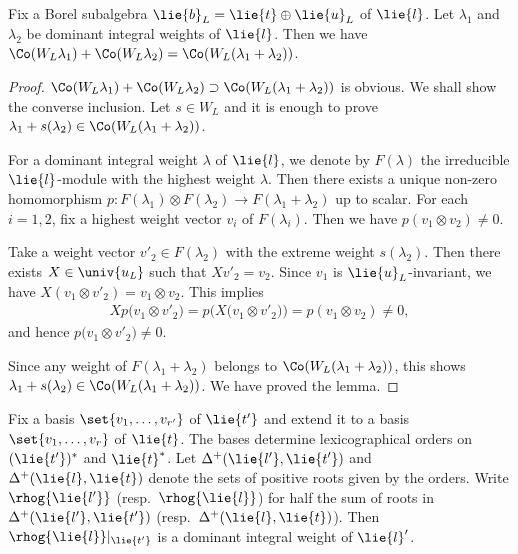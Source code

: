 \begin{Lemma}\label{lem:SumConvex}
	Fix a Borel subalgebra $\lie{b}_L = \lie{t}\oplus \lie{u}_L$ of $\lie{l}$.
	Let $\lambda_1$ and $\lambda_2$ be dominant integral weights of $\lie{l}$.
	Then we have $\Co(W_{L}\lambda_1)+\Co(W_{L}\lambda_2) = \Co(W_{L}(\lambda_1+\lambda_2))$.
\end{Lemma}
	
\begin{proof}
	$\Co(W_{L}\lambda_1)+\Co(W_{L}\lambda_2) \supset \Co(W_{L}(\lambda_1+\lambda_2))$ is obvious.
	We shall show the converse inclusion.
	Let $s \in W_L$ and it is enough to prove $\lambda_1 +s(\lambda_2) \in \Co(W_{L}(\lambda_1+\lambda_2))$.

	For a dominant integral weight $\lambda$ of $\lie{l}$, we denote by $F(\lambda)$ the irreducible $\lie{l}$-module with the highest weight $\lambda$.
	Then there exists a unique non-zero homomorphism $p\colon F(\lambda_1) \otimes F(\lambda_2) \rightarrow F(\lambda_1 + \lambda_2)$ up to scalar.
	For each $i = 1, 2$, fix a highest weight vector $v_i$ of $F(\lambda_i)$.
	Then we have $p(v_1\otimes v_2) \neq 0$.
	
	Take a weight vector $v'_2 \in F(\lambda_2)$ with the extreme weight $s(\lambda_2)$.
	Then there exists $X \in \univ{u_{\mathit{L}}}$ such that $Xv'_2=v_2$.
	Since $v_1$ is $\lie{u}_L$-invariant, we have $X(v_1\otimes v'_2)=v_1 \otimes v_2$.
	This implies
	\begin{align*}
		Xp\bigl(v_1\otimes v'_2\bigr) = p\bigl(X\bigl(v_1\otimes v'_2\bigr)\bigr) = p(v_1\otimes v_2)\neq 0,
	\end{align*}
	and hence $p\bigl(v_1\otimes v'_2\bigr) \neq 0$.
	
	Since any weight of $F(\lambda_1+\lambda_2)$ belongs to $\Co(W_{L}(\lambda_1+\lambda_2))$,
	this shows $\lambda_1+s(\lambda_2) \in \Co(W_{L}(\lambda_1+\lambda_2))$.
	We have proved the lemma.
\end{proof}

Fix a basis $\set{v_1, \ldots, v_{r'}}$ of $\lie{t'}$ and extend it to a basis $\set{v_1, \ldots, v_r}$ of $\lie{t}$.
The bases determine lexicographical orders on $(\lie{t'})^*$ and $\lie{t}^*$.
Let $\Delta^+(\lie{l'}, \lie{t'})$ and $\Delta^+(\lie{l}, \lie{t})$ denote the sets of positive roots given by the orders.
Write $\rhog{\lie{l'}}$ (resp.\ $\rhog{\lie{l}}$) for half the sum of roots in $\Delta^+(\lie{l'}, \lie{t'})$ (resp.\ $\Delta^+(\lie{l}, \lie{t})$).
Then $\rhog{\lie{l}}|_{\lie{t'}}$ is a dominant integral weight of $\lie{l}'$.

